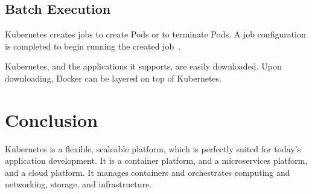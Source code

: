 \subsection{Batch Execution}

Kubernetes creates jobs to create Pods or to terminate Pods.  A job
configuration is completed to begin running the created
job~\cite{concept}.   




Kubernetes, and the applications it supports, are easily downloaded.
Upon downloading, Docker can be layered on top of Kubernetes.   

\section{Conclusion}

Kubernetes is a flexible, scaleable platform, which is perfectly
suited for today's application development.  It is a container
platform, and a microservices platform, and a cloud platform.  It
manages containers and orchestrates computing and networking, storage,
and infrastructure.  













